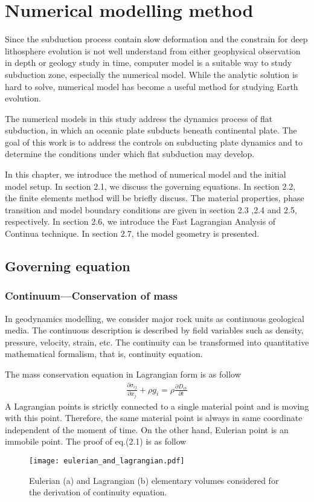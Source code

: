 
\chapter{Numerical modelling method}

Since the subduction process contain slow deformation and the constrain for deep lithosphere evolution is not well understand from either geophysical observation in depth or geology study in time, computer model is a suitable way to  study subduction zone, especially the numerical model. While the analytic solution is hard to solve, numerical model has become a useful method for studying Earth evolution. 

The numerical models in this study address the dynamics process of flat subduction, in which an oceanic plate subducts beneath continental plate. The goal of this work is to address the controls on subducting plate dynamics and to determine the conditions under which flat subduction may develop. 

In this chapter, we introduce the method of numerical model and the initial model setup. In section 2.1, we discuss the governing equations. In section 2.2, the finite elements method will be briefly discuss. The material properties, phase transition and model boundary conditions are given in section 2.3 ,2.4 and 2.5, respectively. In section 2.6, we introduce the Fast Lagrangian Analysis of Continua technique. In section 2.7, the model geometry is presented. 

\section{Governing equation}

\subsection{Continuum---Conservation of mass}

In geodynamics modelling, we consider major rock units as continuous geological media. The continuous description is described by field variables such as density, pressure, velocity, strain, etc. 
The continuity can be transformed into quantitative mathematical formalism, that is, continuity equation.

The mass conservation equation in Lagrangian form is as follow
\begin{align}
\frac{\partial \sigma_{ij}}{\partial x_j}+\rho g_i = \rho \frac{\partial D_{vi}}{\partial t} 
\end{align}
A Lagrangian points is strictly connected to a single material point and is moving with this point. Therefore, the same material point is always in same coordinate independent of the moment of time. On the other hand, Eulerian point is an immobile point.
The proof of eq.(2.1) is as follow
\begin{figure*}[ht!]
    \centering
    \texttt{[image: eulerian\_and\_lagrangian.pdf]}
    \caption{ Eulerian (a) and Lagrangian (b) elementary volumes considered for the derivation of continuity equation. }
    \label{fig::Lagrangian Volume}
\end{figure*}
 
